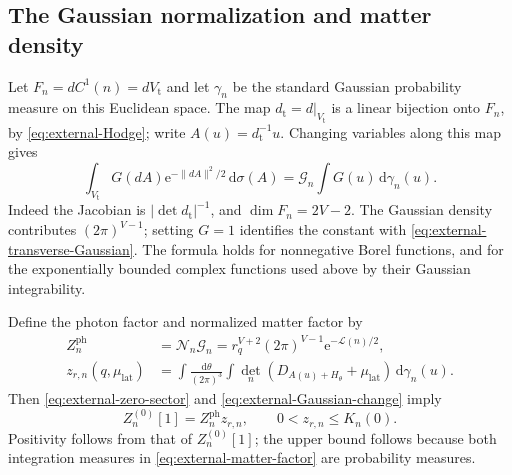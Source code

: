 \documentclass[11pt,letterpaper,reqno]{amsart}
\newcommand{\dd}{\mathrm d}
\begin{document}
\subsection{The Gaussian normalization and matter density}
\label{subsec:external-Gaussian-law}

Let $F_n=dC^1(n)=dV_{\mathrm t}$ and let $\gamma_n$
be the standard Gaussian probability measure on this
Euclidean space. The map $d_{\mathrm t}=d|_{V_{\mathrm t}}$
is a linear bijection onto $F_n$, by
\eqref{eq:external-Hodge}; write $A(u)=d_{\mathrm t}^{-1}u$.
Changing variables along this map gives
\begin{equation}\label{eq:external-Gaussian-change}
 \int_{V_{\mathrm t}}G(dA)\mathrm e^{-\|dA\|^2/2}\,\dd\sigma(A)
                     =\mathcal G_n\int G(u)\,\dd\gamma_n(u).
\end{equation}
Indeed the Jacobian is $|\det d_{\mathrm t}|^{-1}$,
and $\dim F_n=2V-2$. The Gaussian density contributes
$(2\pi)^{V-1}$; setting $G=1$ identifies the constant
with \eqref{eq:external-transverse-Gaussian}.
The formula holds for nonnegative Borel functions,
and for the exponentially bounded complex functions
used above by their Gaussian integrability.

Define the photon factor and normalized matter factor by
\begin{align}
 Z_n^{\mathrm{ph}}&=\mathcal N_n\mathcal G_n
       =r_q^{V+2}(2\pi)^{V-1}
                            \mathrm e^{-\mathcal L(n)/2},
                                  \label{eq:external-photon-factor}\\
 z_{r,n}(q,\mu_{\mathrm{lat}})
   &=\int\frac{\dd\theta}{(2\pi)^3}
       \int\det_n(D_{A(u)+H_\theta}+\mu_{\mathrm{lat}})
                                             \,\dd\gamma_n(u).
                                  \label{eq:external-matter-factor}
\end{align}
Then \eqref{eq:external-zero-sector} and
\eqref{eq:external-Gaussian-change} imply
\begin{equation}\label{eq:external-zero-factorization}
 Z_n^{(0)}[1]=Z_n^{\mathrm{ph}}z_{r,n},\qquad
                         0<z_{r,n}\le K_n(0).
\end{equation}
Positivity follows from that of $Z_n^{(0)}[1]$;
the upper bound follows because both integration
measures in \eqref{eq:external-matter-factor} are
probability measures.
\end{document}
